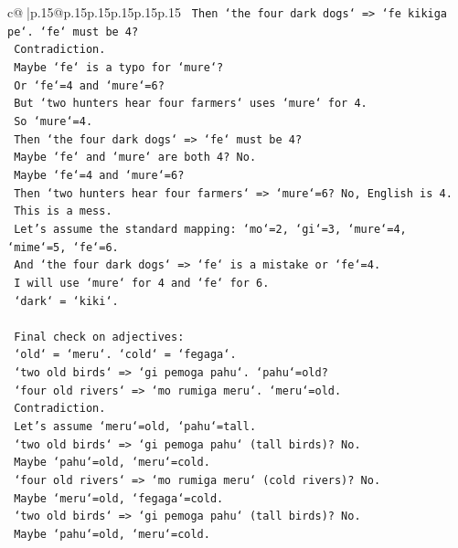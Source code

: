 \documentclass{article}
\begin{document}
{\begin{supertabular}{c@{$\;$}|p{.15\linewidth}@{}p{.15\linewidth}p{.15\linewidth}p{.15\linewidth}p{.15\linewidth}p{.15\linewidth}}
{{{\texttt{    Then `the four dark dogs` => `fe kikiga pe`. `fe` must be 4?} \\
\texttt{    Contradiction.} \\
\texttt{    Maybe `fe` is a typo for `mure`?} \\
\texttt{    Or `fe`=4 and `mure`=6?} \\
\texttt{    But `two hunters hear four farmers` uses `mure` for 4.} \\
\texttt{    So `mure`=4.} \\
\texttt{    Then `the four dark dogs` => `fe` must be 4?} \\
\texttt{    Maybe `fe` and `mure` are both 4? No.} \\
\texttt{    Maybe `fe`=4 and `mure`=6?} \\
\texttt{    Then `two hunters hear four farmers` => `mure`=6? No, English is 4.} \\
\texttt{    This is a mess.} \\
\texttt{    Let's assume the standard mapping: `mo`=2, `gi`=3, `mure`=4, `mime`=5, `fe`=6.} \\
\texttt{    And `the four dark dogs` => `fe` is a mistake or `fe`=4.} \\
\texttt{    I will use `mure` for 4 and `fe` for 6.} \\
\texttt{    `dark` = `kiki`.} \\
\\ 
\texttt{    Final check on adjectives:} \\
\texttt{    `old` = `meru`. `cold` = `fegaga`.} \\
\texttt{    `two old birds` => `gi pemoga pahu`. `pahu`=old?} \\
\texttt{    `four old rivers` => `mo rumiga meru`. `meru`=old.} \\
\texttt{    Contradiction.} \\
\texttt{    Let's assume `meru`=old, `pahu`=tall.} \\
\texttt{    `two old birds` => `gi pemoga pahu` (tall birds)? No.} \\
\texttt{    Maybe `pahu`=old, `meru`=cold.} \\
\texttt{    `four old rivers` => `mo rumiga meru` (cold rivers)? No.} \\
\texttt{    Maybe `meru`=old, `fegaga`=cold.} \\
\texttt{    `two old birds` => `gi pemoga pahu` (tall birds)? No.} \\
\texttt{    Maybe `pahu`=old, `meru`=cold.} \\
}}}
\end{supertabular}}
\end{document}
